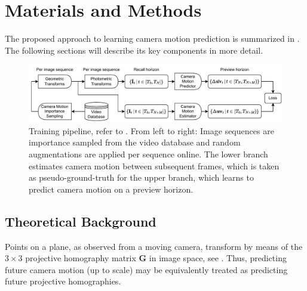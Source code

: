
\section{Materials and Methods}
The proposed approach to learning camera motion prediction is summarized in . The following sections will describe its key components in more detail.

\begin{figure}[htb]
\centering
\includegraphics[width=\textwidth]{fig/23_02_13_miccai_figures.drawio.pdf}
\caption{Training pipeline, refer to  . From left to right: Image sequences are importance sampled from the video database and random augmentations are applied per sequence online. The lower branch estimates camera motion between subsequent frames, which is taken as pseudo-ground-truth for the upper branch, which learns to predict camera motion on a preview horizon.}
\label{c4:fig:training_pipeline}
\end{figure}


\subsection{Theoretical Background}
\label{c4:sec:theoretical_background}
Points on a plane, as observed from a moving camera, transform by means of the $3\times3$ projective homography matrix $\mathbf{G}$ in image space, see . Thus, predicting future camera motion (up to scale) may be equivalently treated as predicting future projective homographies.

